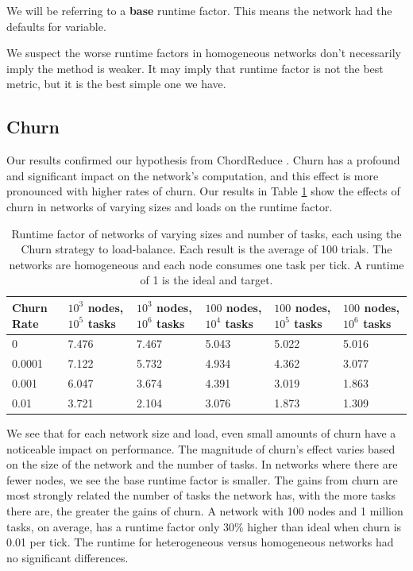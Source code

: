 \documentclass[11pt,conference]{IEEEtran}
\begin{document}
We will be referring to a \textbf{base} runtime factor.
This means the network had the defaults for variable.
{We suspect the worse runtime factors in homogeneous networks don't necessarily imply the method is weaker.
	It may imply that runtime factor is not the best metric, but it is the best simple one we have.
	
	
	\subsection{Churn}
	
	Our results confirmed our hypothesis from ChordReduce \cite{chordreduce}.
	Churn has a profound and significant impact on the network's computation, and this effect is more pronounced with higher rates of churn.
	Our results in Table \ref{tab:ChurnRuntimesHomogenious} show the effects of churn in networks of varying sizes and loads on the runtime factor.
	
	
	\begin{table}[h]
		\small
		\centering
		\caption[Churn Runtimes in a homogenious network]{Runtime factor of networks of varying sizes and number of tasks, each using the Churn strategy to load-balance.  Each result is the average of 100 trials. The networks are homogeneous and each node consumes one task per tick.  A runtime of 1 is the ideal and target.}
		\begin{tabular}{|p{1cm} || p{1cm}  |p{1cm}  |p{1cm}  | p{1cm}  | p{1cm}  |}
			\hline
			Churn Rate & $ 10^{3}$ nodes, $ 10^{5}$ tasks & $ 10^{3}$ nodes, $ 10^{6}$ tasks & $ 100$ nodes, $ 10^{4}$ tasks & $ 100$ nodes, $ 10^{5}$ tasks &$ 100$ nodes, $ 10^{6}$ tasks \\ \hline
			0      & 7.476   &  7.467 &  5.043& 5.022 &5.016 \\\hline
			0.0001 & 7.122   &  5.732 &  4.934& 4.362&3.077 \\\hline
			0.001  & 6.047   &  3.674 &  4.391& 3.019  &1.863\\\hline
			0.01  &  3.721   &  2.104 &  3.076& 1.873 &1.309\\\hline
			
		\end{tabular}
		\label{tab:ChurnRuntimesHomogenious}
	\end{table}
	
	We see that for each network size and load, even small amounts of churn have a noticeable impact on performance.
	The magnitude of churn's effect varies based on the size of the network and the number of tasks.
	In networks where there are fewer nodes, we see the base runtime factor is smaller.
	The gains from churn are most strongly related the number of tasks the network has, with the more tasks there are, the greater the gains of churn.
	A network with 100 nodes and 1 million tasks, on average, has a runtime factor only 30\% higher than ideal when churn is 0.01 per tick.
	The runtime for heterogeneous versus homogeneous networks had no significant differences.
	
}
\end{document}
